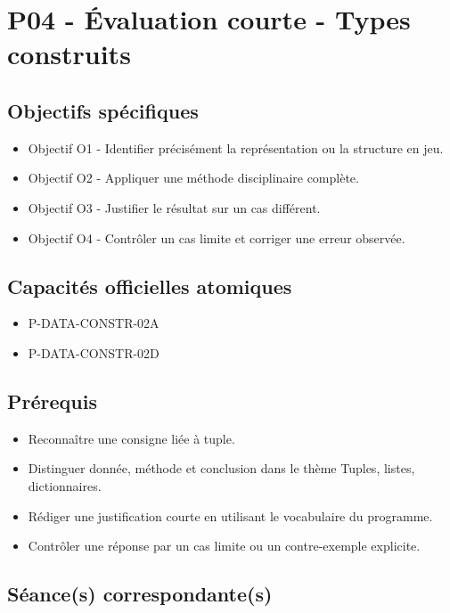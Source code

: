 \section{P04 - Évaluation courte - Types construits}

\subsection{Objectifs spécifiques}

\begin{itemize}
\tightlist
\item
  Objectif O1 - Identifier précisément la représentation ou la structure
  en jeu.
\item
  Objectif O2 - Appliquer une méthode disciplinaire complète.
\item
  Objectif O3 - Justifier le résultat sur un cas différent.
\item
  Objectif O4 - Contrôler un cas limite et corriger une erreur observée.
\end{itemize}

\subsection{Capacités officielles atomiques}

\begin{itemize}
\tightlist
\item
  P-DATA-CONSTR-02A
\item
  P-DATA-CONSTR-02D
\end{itemize}

\subsection{Prérequis}

\begin{itemize}
\tightlist
\item
  Reconnaître une consigne liée à tuple.
\item
  Distinguer donnée, méthode et conclusion dans le thème Tuples, listes,
  dictionnaires.
\item
  Rédiger une justification courte en utilisant le vocabulaire du
  programme.
\item
  Contrôler une réponse par un cas limite ou un contre-exemple
  explicite.
\end{itemize}

\subsection{Séance(s) correspondante(s)}

